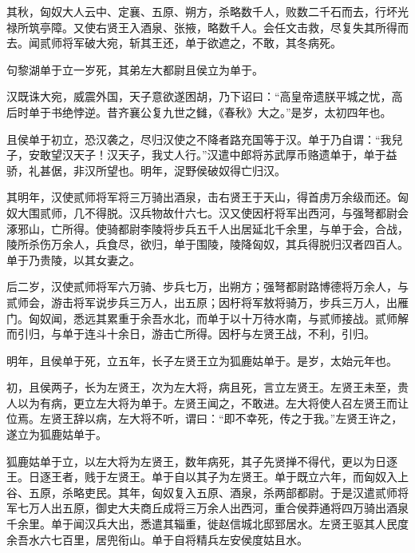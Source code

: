 \documentclass[12pt,UTF8]{ctexbook}
\begin{document}
其秋，匈奴大人云中、定襄、五原、朔方，杀略数千人，败数二千石而去，行坏光禄所筑亭障。又使右贤王入酒泉、张掖，略数千人。会任文击救，尽复失其所得而去。闻贰师将军破大宛，斩其王还，单于欲遮之，不敢，其冬病死。



句黎湖单于立一岁死，其弟左大都尉且侯立为单于。



汉既诛大宛，威震外国，天子意欲遂困胡，乃下诏曰：“高皇帝遗朕平城之忧，高后时单于书绝悖逆。昔齐襄公复九世之雠，《春秋》大之。”是岁，太初四年也。



且侯单于初立，恐汉袭之，尽归汉使之不降者路充国等于汉。单于乃自谓：“我兒子，安敢望汉天子！汉天子，我丈人行。”汉遣中郎将苏武厚币赂遗单于，单于益骄，礼甚倨，非汉所望也。明年，浞野侯破奴得亡归汉。



其明年，汉使贰师将军将三万骑出酒泉，击右贤王于天山，得首虏万余级而还。匈奴大围贰师，几不得脱。汉兵物故什六七。汉又使因杅将军出西河，与强弩都尉会涿邪山，亡所得。使骑都尉李陵将步兵五千人出居延北千余里，与单于会，合战，陵所杀伤万余人，兵食尽，欲归，单于围陵，陵降匈奴，其兵得脱归汉者四百人。单于乃贵陵，以其女妻之。



后二岁，汉使贰师将军六万骑、步兵七万，出朔方；强弩都尉路博德将万余人，与贰师会，游击将军说步兵三万人，出五原；因杅将军敖将骑万，步兵三万人，出雁门。匈奴闻，悉远其累重于余吾水北，而单于以十万待水南，与贰师接战。贰师解而引归，与单于连斗十余日，游击亡所得。因杅与左贤王战，不利，引归。



明年，且侯单于死，立五年，长子左贤王立为狐鹿姑单于。是岁，太始元年也。



初，且侯两子，长为左贤王，次为左大将，病且死，言立左贤王。左贤王未至，贵人以为有病，更立左大将为单于。左贤王闻之，不敢进。左大将使人召左贤王而让位焉。左贤王辞以病，左大将不听，谓曰：“即不幸死，传之于我。”左贤王许之，遂立为狐鹿姑单于。



狐鹿姑单于立，以左大将为左贤王，数年病死，其子先贤掸不得代，更以为日逐王。日逐王者，贱于左贤王。单于自以其子为左贤王。单于既立六年，而匈奴入上谷、五原，杀略吏民。其年，匈奴复入五原、酒泉，杀两部都尉。于是汉遣贰师将军七万人出五原，御史大夫商丘成将三万余人出西河，重合侯莽通将四万骑出酒泉千余里。单于闻汉兵大出，悉遣其辎重，徙赵信城北邸郅居水。左贤王驱其人民度余吾水六七百里，居兜衔山。单于自将精兵左安侯度姑且水。
\end{document}
